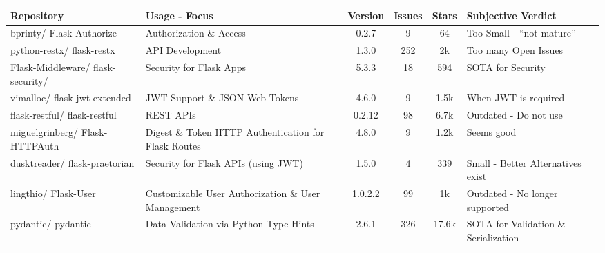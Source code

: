 \begin{changemargin}{-1.5cm}{0cm}
    \centering
    \begin{tabular}{|M{3.0cm}||m{5.0cm}|c|c|c|m{4.0cm}|}
        \hline
            \textbf{Repository} & \textbf{Usage - Focus} & \textbf{Version} & \textbf{Issues} & \textbf{Stars} & Subjective Verdict \\
        \hline
        bprinty/ Flask-Authorize & Authorization \& Access & 0.2.7 & 9 & 64 & Too Small - “not mature” \\
        \hline
        python-restx/ flask-restx & API Development & 1.3.0 & 252 & 2k & Too many Open Issues \\
        \hline
        Flask-Middleware/ flask-security/ & Security for Flask Apps & 5.3.3 & 18 & 594 & SOTA for Security  \\
        \hline
        vimalloc/ flask-jwt-extended & JWT Support \& JSON Web Tokens & 4.6.0 & 9 & 1.5k & When JWT is required \\
        \hline
        flask-restful/ flask-restful & REST APIs & 0.2.12 & 98 & 6.7k & Outdated - Do not use \\
        \hline
        miguelgrinberg/ Flask-HTTPAuth &  Digest \& Token HTTP Authentication for Flask Routes & 4.8.0 & 9 & 1.2k & Seems good \\
        \hline
        dusktreader/ flask-praetorian & Security for Flask APIs (using JWT) & 1.5.0 & 4 & 339 & Small - Better Alternatives exist \\
        \hline
        lingthio/ Flask-User & Customizable User Authorization \& User Management & 1.0.2.2 & 99 & 1k & Outdated - No longer supported \\
        \hline
        pydantic/ pydantic &  Data Validation via Python Type Hints & 2.6.1 & 326 & 17.6k &  SOTA for Validation \& Serialization \\
        \hline
    \end{tabular}
    \label{table:implementation_details_notion_subset}
\end{changemargin}
